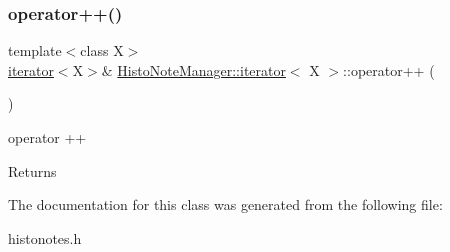 \subsubsection{\texorpdfstring{operator++()}{operator++()}}
{\footnotesize\ttfamily template$<$class X$>$ \\
\hyperlink{class_histo_note_manager_1_1iterator}{iterator}$<$X$>$\& \hyperlink{class_histo_note_manager_1_1iterator}{Histo\+Note\+Manager\+::iterator}$<$ X $>$\+::operator++ (\begin{DoxyParamCaption}{ }\end{DoxyParamCaption})\hspace{0.3cm}{\ttfamily [inline]}}



operator ++ 

\begin{DoxyReturn}{Returns}

\end{DoxyReturn}


The documentation for this class was generated from the following file\+:\begin{DoxyCompactItemize}
\item 
histonotes.\+h\end{DoxyCompactItemize}
